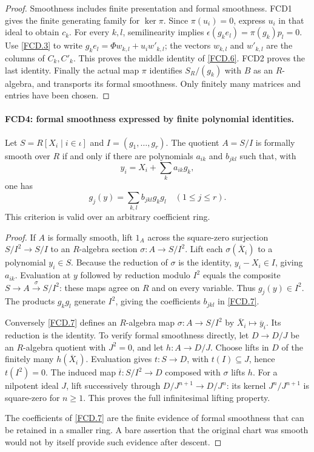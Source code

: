 \begin{proof}
Smoothness includes finite presentation and formal smoothness.
FCD1 gives the finite generating family for $\ker\pi$.
Since $\pi(u_i)=0$, express $u_i$ in that ideal to obtain $c_k$.
For every $k,l$, semilinearity implies
$\epsilon(g_ke_l)=\pi(g_k)p_l=0$.
Use \eqref{FCD.3} to write
$g_ke_l=\Phi w_{k,l}+u_iw'_{k,l}$; the vectors $w_{k,l}$ and
$w'_{k,l}$ are the columns of $C_k,C'_k$.  This proves the
middle identity of \eqref{FCD.6}.  FCD2 proves the last identity.
Finally the actual map $\pi$ identifies $S_R/(g_k)$ with $B$
as an $R$-algebra, and transports its formal smoothness.  Only
finitely many matrices and entries have been chosen.
\end{proof}

\paragraph{FCD4: formal smoothness expressed by finite polynomial identities.}
\label{claim:FCD4}
Let $S=R[X_i\mid i\in\iota]$ and $I=(g_1,\ldots,g_r)$.
The quotient $A=S/I$ is formally smooth over $R$ if and only if
there are polynomials $a_{ik}$ and $b_{jkl}$ such that, with
\[
 y_i=X_i+\sum_k a_{ik}g_k,
\]
one has
\[
 g_j(y)=\sum_{k,l}b_{jkl}g_kg_l\quad(1\le j\le r).   \tag{FCD.7}\label{FCD.7}
\]
This criterion is valid over an arbitrary coefficient ring.

\begin{proof}
If $A$ is formally smooth, lift $1_A$ across the square-zero
surjection $S/I^2\to S/I$ to an $R$-algebra section
$\sigma:A\to S/I^2$.  Lift each $\sigma(\overline X_i)$ to a
polynomial $y_i\in S$.  Because the reduction of $\sigma$ is the
identity, $y_i-X_i\in I$, giving $a_{ik}$.  Evaluation at $y$
followed by reduction modulo $I^2$ equals the composite
$S\to A\xrightarrow{\sigma}S/I^2$: these maps agree on $R$
and on every variable.  Thus $g_j(y)\in I^2$.
The products $g_kg_l$ generate $I^2$, giving the coefficients
$b_{jkl}$ in \eqref{FCD.7}.

Conversely \eqref{FCD.7} defines an $R$-algebra map
$\sigma:A\to S/I^2$ by $\overline X_i\mapsto\overline y_i$.
Its reduction is the identity.  To verify formal smoothness directly,
let $D\to D/J$ be an $R$-algebra quotient with $J^2=0$, and
let $h:A\to D/J$.  Choose lifts in $D$ of the finitely many
$h(\overline X_i)$.  Evaluation gives $t:S\to D$, with
$t(I)\subseteq J$, hence $t(I^2)=0$.  The induced map
$\overline t:S/I^2\to D$ composed with $\sigma$ lifts $h$.
For a nilpotent ideal $J$, lift successively through
$D/J^{n+1}\to D/J^n$: its kernel $J^n/J^{n+1}$ is square-zero
for $n\ge1$.  This proves the full infinitesimal lifting property.

The coefficients of \eqref{FCD.7} are the finite evidence of formal
smoothness that can be retained in a smaller ring.  A bare assertion
that the original chart was smooth would not by itself provide such
evidence after descent.
\end{proof}

